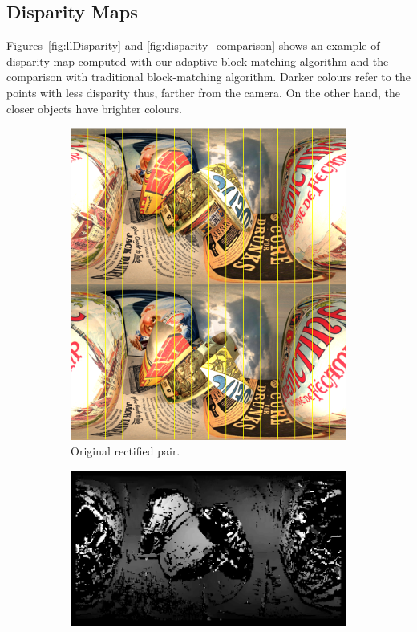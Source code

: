 \subsection{Disparity Maps}
Figures~\ref{fig:llDisparity} and \ref{fig:disparity_comparison}
shows an example of disparity map computed
with our adaptive block-matching algorithm and the comparison with
traditional block-matching algorithm. Darker colours refer to the points
with less disparity thus, farther from the camera. On the other hand, the closer
objects have brighter colours.
%
\begin{figure}[h]
\centering
	\begin{subfigure}{0.7\linewidth}
		\centering
		\includegraphics[width=\linewidth]{img/rectified_pair.png}
		\caption{Original rectified pair.}
	\end{subfigure}
	\begin{subfigure}{0.7\linewidth}
		\centering
		\includegraphics[width=\linewidth]{img/lldisparity2.png}

\end{subfigure}
\end{figure}
